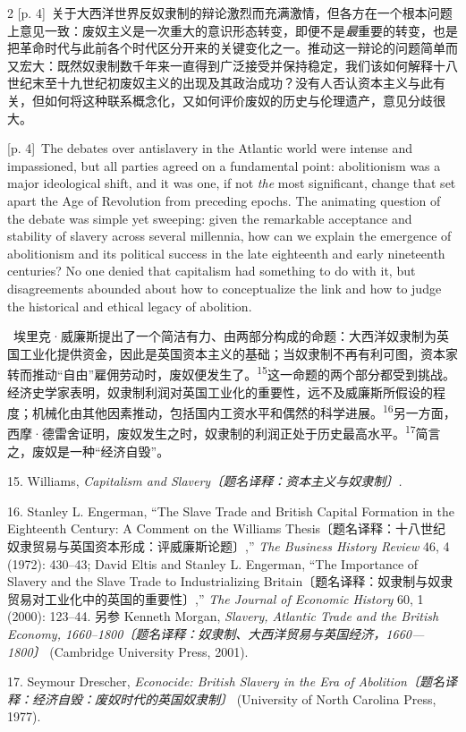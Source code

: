 \documentclass[10pt,a4paper]{article}
\begin{document}
\begin{paracol}{2}
{\scriptsize\color{gray} [p. 4]}\ 关于大西洋世界反奴隶制的辩论激烈而充满激情，但各方在一个根本问题上意见一致：废奴主义是一次重大的意识形态转变，即便不是\textit{最}重要的转变，也是把革命时代与此前各个时代区分开来的关键变化之一。推动这一辩论的问题简单而又宏大：既然奴隶制数千年来一直得到广泛接受并保持稳定，我们该如何解释十八世纪末至十九世纪初废奴主义的出现及其政治成功？没有人否认资本主义与此有关，但如何将这种联系概念化，又如何评价废奴的历史与伦理遗产，意见分歧很大。\par
\switchcolumn
{\scriptsize\color{gray} [p. 4]}\ The debates over antislavery in the Atlantic world were intense and impassioned, but all parties agreed on a fundamental point: abolitionism was a major ideological shift, and it was one, if not \textit{the} most significant, change that set apart the Age of Revolution from preceding epochs. The animating question of the debate was simple yet sweeping: given the remarkable acceptance and stability of slavery across several millennia, how can we explain the emergence of abolitionism and its political success in the late eighteenth and early nineteenth centuries? No one denied that capitalism had something to do with it, but disagreements abounded about how to conceptualize the link and how to judge the historical and ethical legacy of abolition.\par
\switchcolumn*
{\scriptsize\color{gray} [p. 4]}\ 埃里克·威廉斯提出了一个简洁有力、由两部分构成的命题：大西洋奴隶制为英国工业化提供资金，因此是英国资本主义的基础；当奴隶制不再有利可图，资本家转而推动“自由”雇佣劳动时，废奴便发生\mbox{了。\textsuperscript{15}}这一命题的两个部分都受到挑战。经济史学家表明，奴隶制利润对英国工业化的重要性，远不及威廉斯所假设的程度；机械化由其他因素推动，包括国内工资水平和偶然的科学进\mbox{展。\textsuperscript{16}}另一方面，西摩·德雷舍证明，废奴发生之时，奴隶制的利润正处于历史最高水\mbox{平。\textsuperscript{17}}简言之，废奴是一种“经济自毁”。\par{\small 15. Williams, \textit{Capitalism and Slavery〔题名译释：资本主义与奴隶制〕.}\par}{\small 16. Stanley L. Engerman, “The Slave Trade and British Capital Formation in the Eighteenth Century: A Comment on the Williams Thesis〔题名译释：十八世纪奴隶贸易与英国资本形成：评威廉斯论题〕,” \textit{The Business History Review} 46, 4 (1972): 430–43; David Eltis and Stanley L. Engerman, “The Importance of Slavery and the Slave Trade to Industrializing Britain〔题名译释：奴隶制与奴隶贸易对工业化中的英国的重要性〕,” \textit{The Journal of Economic History} 60, 1 (2000): 123–44. 另参 Kenneth Morgan, \textit{Slavery, Atlantic Trade and the British Economy, 1660–1800〔题名译释：奴隶制、大西洋贸易与英国经济，1660—1800〕} (Cambridge University Press, 2001).\par}{\small 17. Seymour Drescher, \textit{Econocide: British Slavery in the Era of Abolition〔题名译释：经济自毁：废奴时代的英国奴隶制〕} (University of North Carolina Press, 1977).\par}

\end{paracol}
\end{document}
